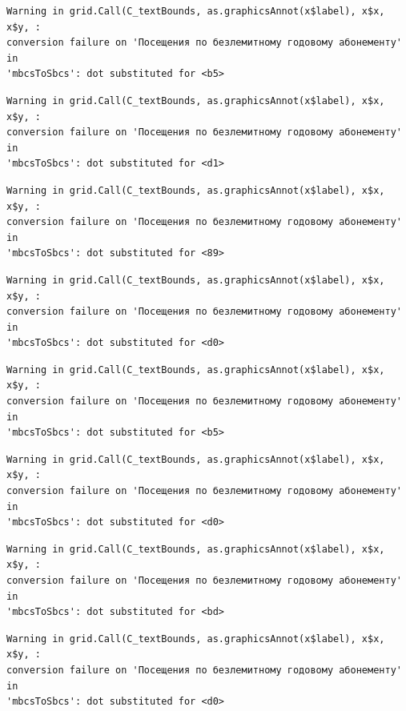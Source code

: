 \documentclass[
  letterpaper,
  DIV=11,
  numbers=noendperiod]{scrartcl}
\begin{document}
\begin{verbatim}
Warning in grid.Call(C_textBounds, as.graphicsAnnot(x$label), x$x, x$y, :
conversion failure on 'Посещения по безлемитному годовому абонементу' in
'mbcsToSbcs': dot substituted for <b5>
\end{verbatim}

\begin{verbatim}
Warning in grid.Call(C_textBounds, as.graphicsAnnot(x$label), x$x, x$y, :
conversion failure on 'Посещения по безлемитному годовому абонементу' in
'mbcsToSbcs': dot substituted for <d1>
\end{verbatim}

\begin{verbatim}
Warning in grid.Call(C_textBounds, as.graphicsAnnot(x$label), x$x, x$y, :
conversion failure on 'Посещения по безлемитному годовому абонементу' in
'mbcsToSbcs': dot substituted for <89>
\end{verbatim}

\begin{verbatim}
Warning in grid.Call(C_textBounds, as.graphicsAnnot(x$label), x$x, x$y, :
conversion failure on 'Посещения по безлемитному годовому абонементу' in
'mbcsToSbcs': dot substituted for <d0>
\end{verbatim}

\begin{verbatim}
Warning in grid.Call(C_textBounds, as.graphicsAnnot(x$label), x$x, x$y, :
conversion failure on 'Посещения по безлемитному годовому абонементу' in
'mbcsToSbcs': dot substituted for <b5>
\end{verbatim}

\begin{verbatim}
Warning in grid.Call(C_textBounds, as.graphicsAnnot(x$label), x$x, x$y, :
conversion failure on 'Посещения по безлемитному годовому абонементу' in
'mbcsToSbcs': dot substituted for <d0>
\end{verbatim}

\begin{verbatim}
Warning in grid.Call(C_textBounds, as.graphicsAnnot(x$label), x$x, x$y, :
conversion failure on 'Посещения по безлемитному годовому абонементу' in
'mbcsToSbcs': dot substituted for <bd>
\end{verbatim}

\begin{verbatim}
Warning in grid.Call(C_textBounds, as.graphicsAnnot(x$label), x$x, x$y, :
conversion failure on 'Посещения по безлемитному годовому абонементу' in
'mbcsToSbcs': dot substituted for <d0>
\end{verbatim}
\end{document}
